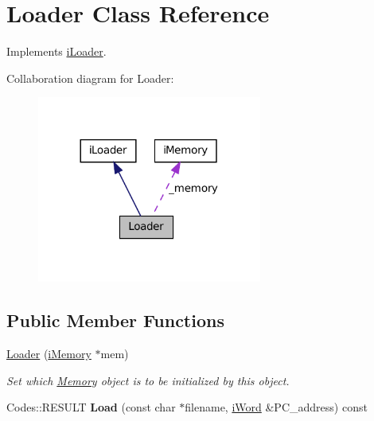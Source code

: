 \hypertarget{classLoader}{
\section{Loader Class Reference}
\label{classLoader}
}


Implements \hyperlink{classiLoader}{iLoader}.  




Collaboration diagram for Loader:\nopagebreak
\begin{figure}[H]
\begin{center}
\leavevmode
\includegraphics[width=209pt]{classLoader__coll__graph}
\end{center}
\end{figure}
\subsection*{Public Member Functions}
\begin{DoxyCompactItemize}
\item 
\hyperlink{classLoader_ab2155ac99a41ba255c88161b9a3d218a}{Loader} (\hyperlink{classiMemory}{iMemory} $\ast$mem)
\begin{DoxyCompactList}\small\item\em Set which \hyperlink{classMemory}{Memory} object is to be initialized by this object. \item\end{DoxyCompactList}\item 
\hypertarget{classLoader_acc964f5d36a91baa584a8ecfa1e3945f}{
Codes::RESULT {\bfseries Load} (const char $\ast$filename, \hyperlink{classiWord}{iWord} \&PC\_\-address) const }
\label{classLoader_acc964f5d36a91baa584a8ecfa1e3945f}

\end{DoxyCompactItemize}
